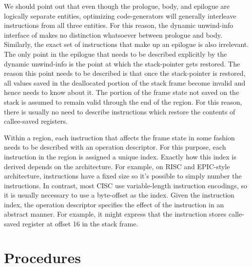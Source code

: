 \documentclass{article}
\begin{document}
We should point out that even though the prologue, body, and epilogue
are logically separate entities, optimizing code-generators will
generally interleave instructions from all three entities.  For this
reason, the dynamic unwind-info interface of  makes no
distinction whatsoever between prologue and body.  Similarly, the
exact set of instructions that make up an epilogue is also irrelevant.
The only point in the epilogue that needs to be described explicitly
by the dynamic unwind-info is the point at which the stack-pointer
gets restored.  The reason this point needs to be described is that
once the stack-pointer is restored, all values saved in the
deallocated portion of the stack frame become invalid and hence
 needs to know about it.  The portion of the frame
state not saved on the stack is assumed to remain valid through the end
of the region.  For this reason, there is usually no need to describe
instructions which restore the contents of callee-saved registers.

Within a region, each instruction that affects the frame state in some
fashion needs to be described with an operation descriptor.  For this
purpose, each instruction in the region is assigned a unique index.
Exactly how this index is derived depends on the architecture.  For
example, on RISC and EPIC-style architecture, instructions have a
fixed size so it's possible to simply number the instructions.  In
contrast, most CISC use variable-length instruction encodings, so it
is usually necessary to use a byte-offset as the index.  Given the
instruction index, the operation descriptor specifies the effect of
the instruction in an abstract manner.  For example, it might express
that the instruction stores calle-saved register  at offset 16
in the stack frame.

\section{Procedures}
\end{document}
